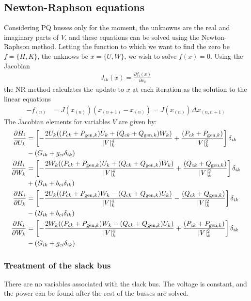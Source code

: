 \documentclass[11pt]{article}
\newcommand{\Vr}{\ensuremath{U}}
\newcommand{\Vi}{\ensuremath{W}}
\newcommand{\Ir}{\ensuremath{H}}
\newcommand{\Ii}{\ensuremath{K}}
\begin{document}
\subsection{Newton-Raphson equations}
Considering PQ busses only for the moment, the unknowns are the real and imaginary parts of $V$, and these equations can be solved using the Newton-Raphson method. Letting the function to which we want to find the zero be $f = \{\Ir, \Ii\}$, the unknows be $x = \{\Vr, \Vi\}$, we wish to solve $f(x) = 0$. Using the Jacobian
\begin{align}
J_{ik}(x) = \frac{\partial f_i(x)}{\partial x_k}
\end{align}
the NR method calculates the update to $x$ at each iteration as the solution to the linear equations
\begin{align}
-f_{(n)} &= J(x_{(n)})(x_{(n+1)}-x_{(n)}) = J(x_{(n)})\Delta x_{(n,n+1)}
\label{EQ_NR}
\end{align}
The Jacobian elements for variables $V$ are given by:
\begin{align}
	\frac{\partial \Ir_i}{\partial \Vr_{k}} 
		&= \left[-\frac{2\Vr_k((P_{ck} + P_{\text{gen},k})\Vr_k + (Q_{ck} + Q_{\text{gen},k})\Vi_k)}{|V|_k^4} + \frac{(P_{ck} + P_{\text{gen},k})}{|V|_k^2} \right]\delta_{ik} \notag \\
		&- (G_{ik} + g_{ci}\delta_{ik}) \\
	\frac{\partial \Ir_i}{\partial \Vi_{k}} 
		&= \left[-\frac{2\Vi_k((P_{ck} + P_{\text{gen},k})\Vr_k + (Q_{ck} + Q_{\text{gen},k})\Vi_k)}{|V|_k^4} + \frac{(Q_{ck} + Q_{\text{gen},k})}{|V|_k^2} \right]\delta_{ik} \notag \\
		&+ (B_{ik} + b_{ci}\delta_{ik}) \\
	\frac{\partial \Ii_i}{\partial \Vr_{k}}
		&= \left[-\frac{2\Vr_k((P_{ck} + P_{\text{gen},k})\Vi_k - (Q_{ck} + Q_{\text{gen},k})\Vr_k)}{|V|_k^4} - \frac{(Q_{ck} + Q_{\text{gen},k})}{|V|_k^2} \right]\delta_{ik} \notag \\
		&- (B_{ik} + b_{ci}\delta_{ik}) \\
	\frac{\partial \Ii_i}{\partial \Vi_{k}}
		&= \left[-\frac{2\Vi_k((P_{ck} + P_{\text{gen},k})\Vi_k - (Q_{ck} + Q_{\text{gen},k})\Vr_k)}{|V|_k^4} + \frac{(P_{ck} + P_{\text{gen},k})}{|V|_k^2} \right] \delta_{ik} \notag \\
		&- (G_{ik} + g_{ci}\delta_{ik}) \\
\end{align}

\subsubsection{Treatment of the slack bus}
There are no variables associated with the slack bus. The voltage is constant, and the power can be found after the rest of the busses are solved.
\end{document}
